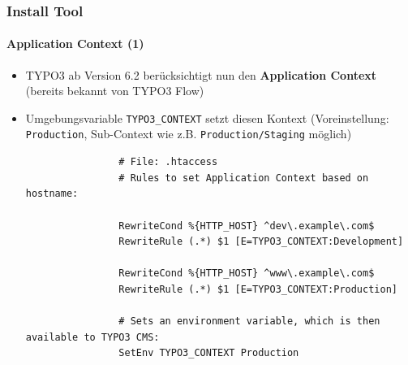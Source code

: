 
\begin{frame}[fragile]
	\frametitle{Install Tool}
	\framesubtitle{Application Context (1)}

	\begin{itemize}
		\item TYPO3 ab Version 6.2 berücksichtigt nun den \textbf{Application Context}\newline
			\smaller(bereits bekannt von TYPO3 Flow)\normalsize
		\item Umgebungsvariable \texttt{TYPO3\_CONTEXT} setzt diesen Kontext\newline
			\smaller(Voreinstellung: \texttt{Production}, Sub-Context wie z.B. \texttt{Production/Staging} möglich)\normalsize

			\begin{lstlisting}
				# File: .htaccess
				# Rules to set Application Context based on hostname:

				RewriteCond %{HTTP_HOST} ^dev\.example\.com$
				RewriteRule (.*) $1 [E=TYPO3_CONTEXT:Development]

				RewriteCond %{HTTP_HOST} ^www\.example\.com$
				RewriteRule (.*) $1 [E=TYPO3_CONTEXT:Production]

				# Sets an environment variable, which is then available to TYPO3 CMS:
				SetEnv TYPO3_CONTEXT Production
			\end{lstlisting}

	\end{itemize}

\end{frame}


